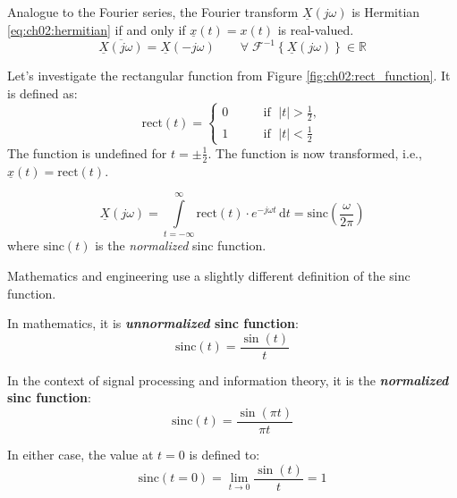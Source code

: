\begin{refsection}
Analogue to the Fourier series, the Fourier transform $\underline{X}(j \omega)$ is Hermitian \eqref{eq:ch02:hermitian} if and only if $\underline{x}(t) = x(t)$ is real-valued.
\begin{equation}
	\overline{\underline{X}(j \omega)} = \underline{X}(-j \omega) \qquad \forall \; \mathcal{F}^{-1}\left\{\underline{X}(j \omega)\right\} \in \mathbb{R}
\end{equation}

Let's investigate the  rectangular function from Figure \ref{fig:ch02:rect_function}. It is defined as:
\begin{equation}
	\mathrm{rect}(t) = \begin{cases}
		0 & \qquad \text{if } \; |t| > \frac{1}{2}, \\
		1 & \qquad \text{if } \; |t| < \frac{1}{2}
	\end{cases}
	\label{eq:ch02:rect_function}
\end{equation}%
%
The function is undefined for $t = \pm \frac{1}{2}$. The function is now transformed, i.e., $\underline{x}(t) = \mathrm{rect}(t)$.

\begin{equation}
	\underline{X}\left(j \omega\right) =  \int\limits_{t = -\infty}^{\infty} \mathrm{rect}(t) \cdot e^{-j \omega t} \, \mathrm{d} t = \mathrm{sinc}\left(\frac{\omega}{2 \pi}\right)
\end{equation}
where $\mathrm{sinc}(t)$ is the \emph{normalized} sinc function. 

\begin{attention}
	Mathematics and engineering use a slightly different definition of the sinc function.
	
	In mathematics, it is  \textbf{\textit{unnormalized} sinc function}:
	\begin{equation*}
		\mathrm{sinc}(t) = \frac{\sin\left(t\right)}{t}
	\end{equation*}
	
	In the context of signal processing and information theory, it is the  \textbf{\textit{normalized} sinc function}:
	\begin{equation*}
		\mathrm{sinc}(t) = \frac{\sin\left(\pi t\right)}{\pi t}
	\end{equation*}
	
	In either case, the value at $t = 0$ is defined to:
	\begin{equation*}
		\mathrm{sinc}(t = 0) = \lim\limits_{t \rightarrow 0} \frac{\sin\left(t\right)}{t} = 1
	\end{equation*}
\end{attention}


\end{refsection}
